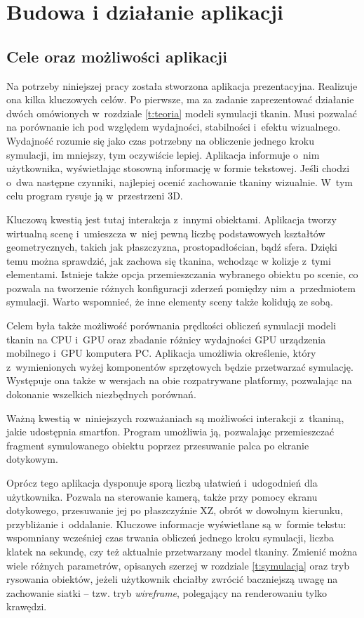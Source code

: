 \chapter{Budowa i działanie aplikacji}
\label{t:praktyka}
	
	\section{Cele oraz możliwości aplikacji}
	\label{t:praktyka:cel}
	
	
	Na potrzeby niniejszej pracy została stworzona aplikacja prezentacyjna. Realizuje ona kilka kluczowych celów. Po pierwsze, ma za zadanie zaprezentować działanie dwóch omówionych w~rozdziale \ref{t:teoria} modeli symulacji tkanin. Musi pozwalać na porównanie ich pod względem wydajności, stabilności i~efektu wizualnego. Wydajność rozumie się jako czas potrzebny na obliczenie jednego kroku symulacji, im mniejszy, tym oczywiście lepiej. Aplikacja informuje o~nim użytkownika, wyświetlając stosowną informację w formie tekstowej. Jeśli chodzi o~dwa następne czynniki, najlepiej ocenić zachowanie tkaniny wizualnie. W~tym celu program rysuje ją w~przestrzeni 3D. 
	
	Kluczową kwestią jest tutaj interakcja z~innymi obiektami. Aplikacja tworzy wirtualną scenę i~umieszcza w~niej pewną liczbę podstawowych kształtów geometrycznych, takich jak płaszczyzna, prostopadłościan, bądź sfera. Dzięki temu można sprawdzić, jak zachowa się tkanina, wchodząc w kolizje z~tymi elementami. Istnieje także opcja przemieszczania wybranego obiektu po scenie, co pozwala na tworzenie różnych konfiguracji zderzeń pomiędzy nim a~przedmiotem symulacji. Warto wspomnieć, że inne elementy sceny także kolidują ze sobą.
	
	Celem była także możliwość porównania prędkości obliczeń symulacji modeli tkanin na CPU i~GPU oraz zbadanie różnicy wydajności GPU urządzenia mobilnego i~GPU komputera PC. Aplikacja umożliwia określenie, który z~wymienionych wyżej komponentów sprzętowych będzie przetwarzać symulację. Występuje ona także w wersjach na obie rozpatrywane platformy, pozwalając na dokonanie wszelkich niezbędnych porównań.
	
	Ważną kwestią w~niniejszych rozważaniach są możliwości interakcji z~tkaniną, jakie udostępnia smartfon. Program umożliwia ją, pozwalając przemieszczać fragment symulowanego obiektu poprzez przesuwanie palca po ekranie dotykowym.
	
	Oprócz tego aplikacja dysponuje sporą liczbą ułatwień i~udogodnień dla użytkownika. Pozwala na sterowanie kamerą, także przy pomocy ekranu dotykowego, przesuwanie jej po płaszczyźnie XZ, obrót w dowolnym kierunku, przybliżanie i~oddalanie. Kluczowe informacje wyświetlane są w~formie tekstu: wspomniany wcześniej czas trwania obliczeń jednego kroku symulacji, liczba klatek na sekundę, czy też aktualnie przetwarzany model tkaniny. Zmienić można wiele różnych parametrów, opisanych szerzej w rozdziale \ref{t:symulacja} oraz tryb rysowania obiektów, jeżeli użytkownik chciałby zwrócić baczniejszą uwagę na zachowanie siatki -- tzw. tryb \emph{wireframe}, polegający na renderowaniu tylko krawędzi.
	
